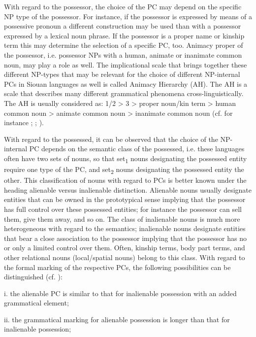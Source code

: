 \documentclass[output=paper]{LSP/langsci}
\begin{document}
With regard to the possessor, the choice of the PC may depend on the specific NP type of the possessor. For instance, if the possessor is expressed by means of a possessive pronoun a different construction may be used than with a possessor expressed by a lexical noun phrase. If the possessor is a proper name or kinship term this may determine the selection of a specific PC, too. Animacy proper of the possessor, i.e. possessor NPs with a human, animate or inanimate common noun, may play a role as well. The implicational scale that brings together these different NP-types that may be relevant for the choice of different NP-internal PCs in Siouan languages as well is called Animacy Hierarchy (AH). The AH is a scale that describes many different grammatical phenomena cross-linguistically. The AH is usually considered as: 1/2 > 3 > proper noun/kin term > human common noun > animate common noun > inanimate common noun (cf. for instance \citealt{Dixon1979}; \citealt{Comrie1989}; \citealt{Croft2003}).

With regard to the possessed, it can be observed that the choice of the NP-internal PC depends on the semantic class of the possessed, i.e. these languages often have two sets of nouns, so that set\textsubscript{1} nouns designating the possessed entity require one type of the PC, and set\textsubscript{2} nouns designating the possessed entity the other. This classification of nouns with regard to PCs is better known under the heading alienable versus inalienable distinction. Alienable nouns usually designate entities that can be owned in the prototypical sense implying that the possessor has full control over these possessed entities; for instance the possessor can sell them, give them away, and so on. The class of inalienable nouns is much more heterogeneous with regard to the semantics; inalienable nouns designate entities that bear a close association to the possessor implying that the possessor has no or only a limited control over them. Often, kinship terms, body part terms, and other relational nouns (local/spatial nouns) belong to this class. 
With regard to the formal marking of the respective PCs, the following possibilities can be distinguished (cf. \citealt[286-290]{Dixon2010}):

\vspace{1em}
i.	the alienable PC is similar to that for inalienable possession with an added grammatical element;

ii.	the grammatical marking for alienable possession is longer than that for inalienable possession;
\end{document}
